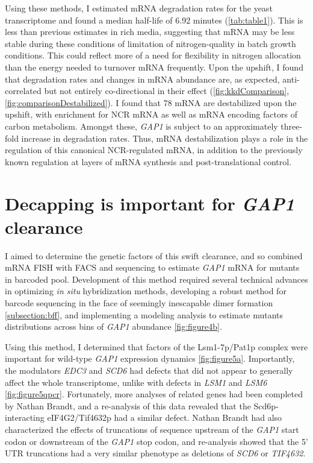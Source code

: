 Using these methods, I estimated mRNA degradation rates for the
yeast transcriptome and found a median half-life of 6.92 minutes
(\autoref{tab:table1}).
This is less than previous estimates in rich media, suggesting that
mRNA may be less stable during these conditions of limitation of
nitrogen-quality in batch growth conditions. This could reflect 
more of a need for flexibility in nitrogen allocation than the
energy needed to turnover mRNA frequently.
Upon the upshift,
I found that degradation rates and changes in
mRNA abundance are, as expected, anti-correlated but not entirely
co-directional in their effect
(\autoref{fig:kkdComparison},\autoref{fig:comparisonDestabilized}).
I found that 78 mRNA are destabilized upon the upshift, with
enrichment for NCR mRNA as well as mRNA encoding factors of carbon
metabolism. Amongst these, \textit{GAP1} is subject to an
approximately three-fold increase in degradation rates. 
Thus, mRNA destabilization plays a role in the regulation of this
canonical NCR-regulated mRNA, in addition to the previously known
regulation at layers of mRNA synthesis and post-translational
control.

\section{Decapping is important for \textit{GAP1} clearance}

I aimed to determine the genetic factors of this swift clearance, and
so combined mRNA FISH with FACS and sequencing to estimate
\textit{GAP1} mRNA for mutants in barcoded pool. Development of this
method required several technical advances in optimizing 
\textit{in situ} hybridization methods, developing a robust method 
for barcode sequencing in the face of seemingly inescapable dimer 
formation \autoref{subsection:bff}, and implementing a modeling
analysis to estimate mutants distributions across bins of 
\textit{GAP1} abundance \autoref{fig:figure4b}. 

Using this method, I determined that factors of the Lsm1-7p/Pat1p
complex were important for wild-type \textit{GAP1} expression
dynamics \autoref{fig:figure5a}. Importantly, the modulators
\textit{EDC3} and \textit{SCD6} had defects that did not appear
to generally affect the whole transcriptome, unlike with defects in
\textit{LSM1} and \textit{LSM6} \autoref{fig:figure5qpcr}.
Fortunately, more analyses of related genes had been completed
by Nathan Brandt, and a re-analysis of this data revealed that 
the Scd6p-interacting eIF4G2/Tif4632p had a similar defect.
Nathan Brandt had also characterized the effects of truncations of
sequence upstream of the \textit{GAP1} start codon or downstream
of the \textit{GAP1} stop codon, and re-analysis showed that the 5'
UTR truncations had a very similar phenotype as deletions of
\textit{SCD6} or \textit{TIF4632}.

